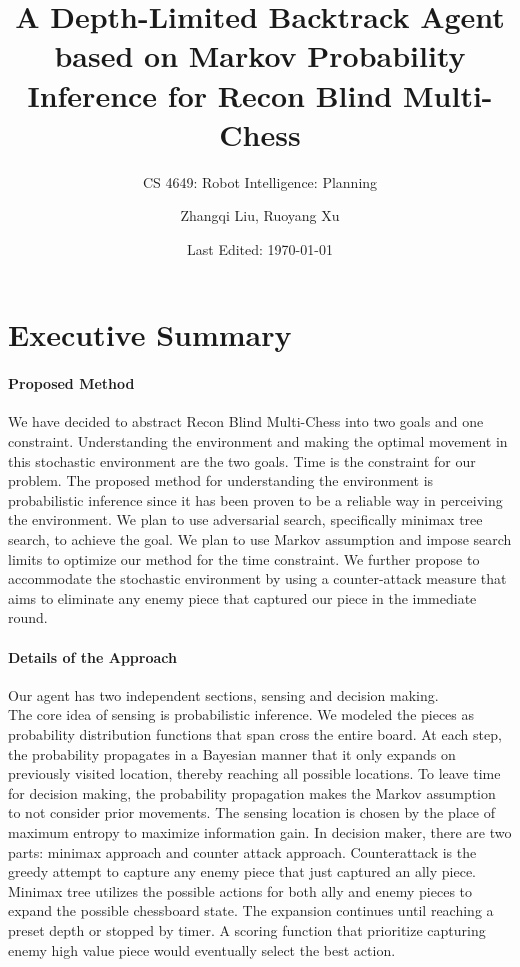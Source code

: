 \documentclass[11pt]{article}
\title{A Depth-Limited Backtrack Agent based on Markov Probability Inference for Recon Blind Multi-Chess}
\author{Zhangqi Liu, Ruoyang Xu}
\subtitle{CS 4649: Robot Intelligence: Planning}
\date{Last Edited: \today}
\begin{document}
\maketitle
\pagebreak

\section*{Executive Summary}
\paragraph{Proposed Method}
We have decided to abstract Recon Blind Multi-Chess into two goals and one constraint. Understanding the environment and making the optimal movement in this stochastic environment are the two goals. Time is the constraint for our problem. The proposed method for understanding the environment is probabilistic inference since it has been proven to be a reliable way in perceiving the environment. We plan to use adversarial search, specifically minimax tree search, to achieve the goal. We plan to use Markov assumption and impose search limits to optimize our method for the time constraint. We further propose to accommodate the stochastic environment by using a counter-attack measure that aims to eliminate any enemy piece that captured our piece in the immediate round. 
\paragraph{Details of the Approach}
Our agent has two independent sections, sensing and decision making.\vspace{6pt}\\
The core idea of sensing is probabilistic inference. We modeled the pieces as probability distribution functions that span cross the entire board. At each step, the probability propagates in a Bayesian manner that it only expands on previously visited location, thereby reaching all possible locations. To leave time for decision making, the probability propagation makes the Markov assumption to not consider prior movements. The sensing location is chosen by the place of maximum entropy to maximize information gain.
In decision maker, there are two parts: minimax approach and counter attack approach. Counterattack is the greedy attempt to capture any enemy piece that just captured an ally piece. Minimax tree utilizes the possible actions for both ally and enemy pieces to expand the possible chessboard state. The expansion continues until reaching a preset depth or stopped by timer. A scoring function that prioritize capturing enemy high value piece would eventually select the best action.
\end{document}
